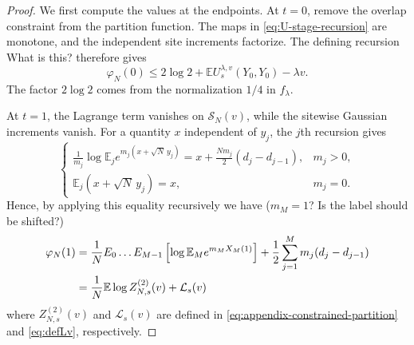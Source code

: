 \documentclass[11pt]{article}
\numberwithin{equation}{section}
\newcommand{\E}{\mathbb{E}}
\newcommand{\1}{\mathbf 1}
\begin{document}
\begin{proof}
We first compute the values at the endpoints.  At $t=0$, remove the overlap
constraint from the partition function.  The maps in
\eqref{eq:U-stage-recursion} are monotone, and the independent site
increments factorize.  The defining recursion {\color{red}What is this?} therefore gives
\begin{equation}
\varphi_N(0)
\leq2\log2+\E U_s^{\lambda,v}(Y_0,Y_0)-\lambda v.
\label{eq:GT-endpoint-zero}
\end{equation}
The factor $2\log2$ comes from the normalization $1/4$ in
$f_\lambda$.

At $t=1$, the Lagrange term vanishes on ${\mathcal{S}}_N(v)$, while the
sitewise Gaussian increments vanish. For a quantity $x$ independent
of $y_j$, the $j$th recursion gives
\[
\begin{cases}
\displaystyle
\frac1{m_j}\log\E_j e^{m_j(x+\sqrt N\,y_j)}
=x+\frac{Nm_j}{2}(d_j-d_{j-1}),&m_j>0,\\[3mm]
\displaystyle
\E_j(x+\sqrt N\,y_j)=x,&m_j=0.
\end{cases}
\]
Hence, by applying this equality recursively we have {\color{red} ($m_M=1$? Is the label should be shifted?)}
\begin{align}
\varphi_N(1)
&=\frac1N E_0 \dots E_{M-1} \left[ \log \E _M e^{m_M X_M(1)} \right] 
+\frac12\sum_{j=1}^Mm_j(d_j-d_{j-1})
\notag\\
&=\frac1N\E\log Z_{N,s}^{(2)}(v)+\mathcal L_s(v)
\label{eq:GT-endpoint-one}
\end{align}
where $Z_{N,s}^{(2)}(v)$  and $\mathcal L_s(v)$ are defined in \eqref{eq:appendix-constrained-partition} and \eqref{eq:defLv}, respectively.


\end{proof}
\end{document}
